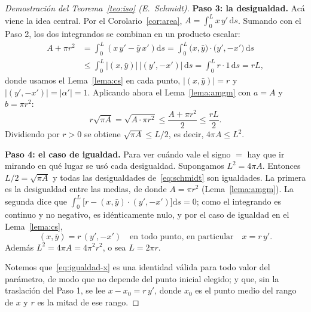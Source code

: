 \documentclass[12pt,a4paper]{article}
\theoremstyle{profesional}
\theoremstyle{definicion-style}
\newcommand{\abs}[1]{\left| #1 \right|}
\begin{document}
\begin{proof}[Demostración del Teorema~\ref{teo:iso} (E.~Schmidt)]
    \textbf{Paso 3: la desigualdad.}
    Acá viene la idea central. Por el Corolario~\ref{cor:area}, \( A = \int_0^L x \, y' \, \mathrm{d}s \). Sumando con el Paso 2, los dos integrandos se combinan en un producto escalar:
    \begin{align*}
        A + \pi r^2 & = \int_0^L \left( x \, y' - \bar y \, x' \right) \mathrm{d}s = \int_0^L \big( x, \bar y \big) \cdot \big( y', -x' \big) \, \mathrm{d}s \\
                    & \leq \int_0^L \abs{(x, \bar y)} \, \abs{(y', -x')} \, \mathrm{d}s = \int_0^L r \cdot 1 \, \mathrm{d}s = r L,
    \end{align*}
    donde usamos el Lema~\ref{lema:cs} en cada punto, \( \abs{(x, \bar y)} = r \) y \( \abs{(y', -x')} = \abs{\alpha'} = 1 \). Aplicando ahora el Lema~\ref{lema:amgm} con \( a = A \) y \( b = \pi r^2 \):
    \[
        r \sqrt{\pi A} = \sqrt{A \cdot \pi r^2} \leq \frac{A + \pi r^2}{2} \leq \frac{r L}{2}.
        \tag{\(\ast\)}\label{eq:schmidt}
    \]
    Dividiendo por \( r > 0 \) se obtiene \( \sqrt{\pi A} \leq L/2 \), es decir, \( 4\pi A \leq L^2 \).

    \textbf{Paso 4: el caso de igualdad.}
    Para ver cuándo vale el signo \( = \) hay que ir mirando en qué lugar se usó cada desigualdad. Supongamos \( L^2 = 4\pi A \). Entonces \( L/2 = \sqrt{\pi A} \) y todas las desigualdades de~\eqref{eq:schmidt} son igualdades. La primera es la desigualdad entre las medias, de donde \( A = \pi r^2 \) (Lema~\ref{lema:amgm}).
    La segunda dice que \( \int_0^L \big[ r - (x, \bar y) \cdot (y', -x') \big] \mathrm{d}s = 0 \); como el integrando es continuo y no negativo, es idénticamente nulo, y por el caso de igualdad en el Lema~\ref{lema:cs},
    \[
        (x, \bar y) = r \, (y', -x') \quad \text{en todo punto, en particular} \quad x = r \, y'.
        \tag{\(\ast\ast\)}\label{eq:igualdad-x}
    \]
    Además \( L^2 = 4\pi A = 4\pi^2 r^2 \), o sea \( L = 2\pi r \).

    Notemos que~\eqref{eq:igualdad-x} es una identidad válida para todo valor del parámetro, de modo que no depende del punto inicial elegido; y que, sin la traslación del Paso 1, se lee
    \( x - x_0 = r \, y' \), donde \( x_0 \) es el punto medio del rango de \( x \) y \( r \) es la mitad de ese rango.


\end{proof}
\end{document}
